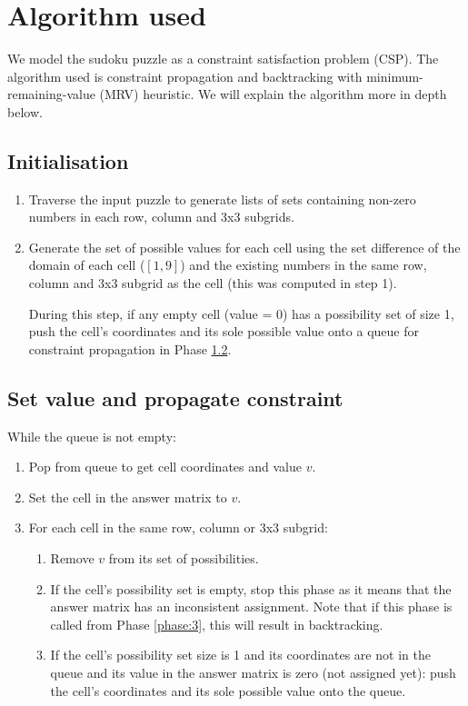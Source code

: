 \documentclass[11pt, a4paper]{article}
\begin{document}
\section{Algorithm used}
We model the sudoku puzzle as a constraint satisfaction problem (CSP).
The algorithm used is constraint propagation and backtracking with minimum-remaining-value (MRV) heuristic.
We will explain the algorithm more in depth below.

\subsection{Initialisation}
\label{phase:1}
\begin{enumerate}
  \item Traverse the input puzzle to generate lists of sets containing non-zero numbers in each row, column and 3x3 subgrids.
  \item Generate the set of possible values for each cell using the set difference of the domain of each cell ($[1, 9]$) and the existing numbers in the same row, column and 3x3 subgrid as the cell (this was computed in step 1).

        During this step, if any empty cell (value = 0) has a possibility set of size 1, push the cell's coordinates and its sole possible value onto a queue for constraint propagation in Phase \ref{phase:2}.
\end{enumerate}


\subsection{Set value and propagate constraint}
\label{phase:2}
While the queue is not empty:
\begin{enumerate}
  \item Pop from queue to get cell coordinates and value $v$.
  \item Set the cell in the answer matrix to $v$.
  \item For each cell in the same row, column or 3x3 subgrid:
        \begin{enumerate}
          \item Remove $v$ from its set of possibilities.
          \item If the cell's possibility set is empty, stop this phase as it means that the answer matrix has an inconsistent assignment. Note that if this phase is called from Phase \ref{phase:3}, this will result in backtracking.
          \item If the cell's possibility set size is 1 and its coordinates are not in the queue and its value in the answer matrix is zero (not assigned yet): push the cell's coordinates and its sole possible value onto the queue.
        \end{enumerate}
\end{enumerate}
\end{document}
